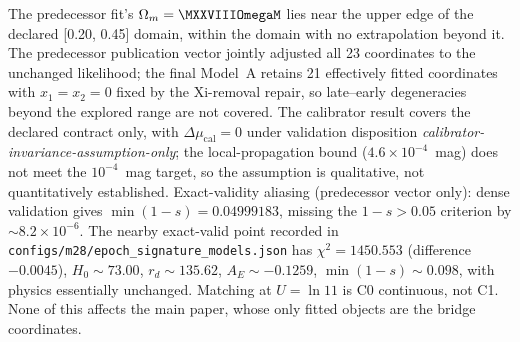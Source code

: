 The predecessor fit's $\Omega_{m} = \MXXVIIIOmegaM$ lies near the upper
edge of the declared [0.20, 0.45] domain, within the domain with no
extrapolation beyond it. The predecessor publication vector jointly
adjusted all 23 coordinates to the unchanged likelihood; the final
Model~A retains 21 effectively fitted coordinates with $x_{1}=x_{2}=0$
fixed by the Xi-removal repair, so late--early degeneracies beyond the
explored range are not covered. The calibrator result covers the
declared contract only, with $\Delta\mu_{\mathrm{cal}} = 0$ under
validation disposition \textit{calibrator-invariance-assumption-only};
the local-propagation bound ($4.6\times10^{-4}$~mag) does not meet the
$10^{-4}$~mag target, so the assumption is qualitative, not
quantitatively established. Exact-validity aliasing (predecessor vector
only): dense validation gives $\min(1-s)=0.04999183$, missing the
$1-s>0.05$ criterion by $\sim$$8.2\times10^{-6}$. The nearby exact-valid
point recorded in \texttt{configs/m28/epoch\_signature\_models.json}
has $\chi^{2}=1450.553$ (difference $-0.0045$), $H_{0}\sim73.00$,
$r_{d}\sim135.62$, $A_{E}\sim-0.1259$, $\min(1-s)\sim0.098$, with physics
essentially unchanged. Matching at $U=\ln11$ is C0 continuous, not C1.
None of this affects the main paper, whose only fitted objects are the
bridge coordinates.

